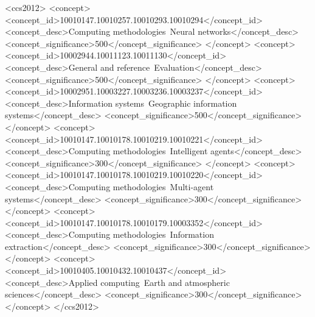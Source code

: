 \documentclass[sigconf]{acmart}
\begin{document}
\begin{CCSXML}
<ccs2012>
   <concept>
       <concept_id>10010147.10010257.10010293.10010294</concept_id>
       <concept_desc>Computing methodologies~Neural networks</concept_desc>
       <concept_significance>500</concept_significance>
       </concept>
   <concept>
       <concept_id>10002944.10011123.10011130</concept_id>
       <concept_desc>General and reference~Evaluation</concept_desc>
       <concept_significance>500</concept_significance>
       </concept>
   <concept>
       <concept_id>10002951.10003227.10003236.10003237</concept_id>
       <concept_desc>Information systems~Geographic information systems</concept_desc>
       <concept_significance>500</concept_significance>
       </concept>
   <concept>
       <concept_id>10010147.10010178.10010219.10010221</concept_id>
       <concept_desc>Computing methodologies~Intelligent agents</concept_desc>
       <concept_significance>300</concept_significance>
       </concept>
   <concept>
       <concept_id>10010147.10010178.10010219.10010220</concept_id>
       <concept_desc>Computing methodologies~Multi-agent systems</concept_desc>
       <concept_significance>300</concept_significance>
       </concept>
   <concept>
       <concept_id>10010147.10010178.10010179.10003352</concept_id>
       <concept_desc>Computing methodologies~Information extraction</concept_desc>
       <concept_significance>300</concept_significance>
       </concept>
   <concept>
       <concept_id>10010405.10010432.10010437</concept_id>
       <concept_desc>Applied computing~Earth and atmospheric sciences</concept_desc>
       <concept_significance>300</concept_significance>
       </concept>
 </ccs2012>
\end{CCSXML}




\maketitle
\end{document}
